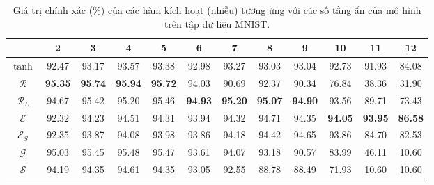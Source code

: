\begin{table}[ht!]
\centering
\def\arraystretch{1.1}
\begin{tabular}{c|c|c|c|c|c|c|c|c|c|c|c|}
\cline{2-12}
                        & 2     & 3     & 4     & 5     & 6     & 7     & 8     & 9     & 10    & 11    & 12    \\ \hline
\multicolumn{1}{|c|}{$\tanh$} & 92.47 & 93.17 & 93.57 & 93.38 & 92.98 & 93.27 & 93.03 & 93.04 & 92.73 & 91.93 & 84.08 \\ \hline
\multicolumn{1}{|c|}{$\mathcal{R}$} & \textbf{95.35} & \textbf{95.74} & \textbf{95.94} & \textbf{95.72} & 94.03 & 90.69 & 92.37 & 90.34 & 76.84 & 38.36 & 31.90 \\ \hline
\multicolumn{1}{|c|}{$\mathcal{R}_L$} & 94.67 & 95.42 & 95.20 & 95.46 & \textbf{94.93} & \textbf{95.20} & \textbf{95.07} & \textbf{94.90} & 93.56 & 89.71 & 73.43 \\ \hline
\multicolumn{1}{|c|}{$\mathcal{E}$} & 92.32 & 94.23 & 94.51 & 94.31 & 93.94 & 94.32 & 94.71 & 94.35 & \textbf{94.05} & \textbf{93.95} & \textbf{86.58} \\ \hline
\multicolumn{1}{|c|}{$\mathcal{E}_S$} & 92.35 & 93.87 & 94.08 & 93.98 & 93.86 & 94.18 & 94.42 & 94.65 & 93.86 & 84.70 & 82.53 \\ \hline
\multicolumn{1}{|c|}{$\mathcal{G}$} & 95.03 & 95.45 & 95.48 & 95.47 & 93.61 & 94.07 & 93.18 & 90.57 & 83.99 & 46.11 & 10.60 \\ \hline
\multicolumn{1}{|c|}{$\mathcal{S}$} & 94.19 & 94.35 & 94.61 & 94.35 & 93.05 & 92.55 & 88.78 & 88.49 & 71.93 & 10.60 & 10.60 \\ \hline
\end{tabular}
\caption{Giá trị chính xác (\%) của các hàm kích hoạt (nhiễu) tương ứng với các số tầng ẩn của mô hình trên tập dữ liệu MNIST.}
\label{tab:wowinoiseacc}
\end{table}

